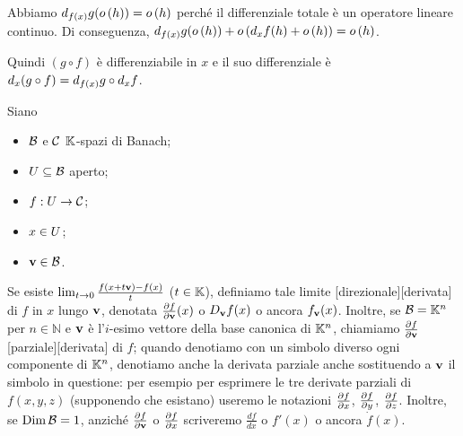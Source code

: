\par Abbiamo $\TotalDifferential{g}[f(x)](\Littleo{h}) = \Littleo{h}$ perch\'e il differenziale totale \`e un operatore lineare continuo. Di conseguenza, $\TotalDifferential{g}[f(x)](\Littleo{h}) + \Littleo{\TotalDifferential{f}[x](h) + \Littleo{h}} = \Littleo{h}$.
\par Quindi $(g \circ f)$ \`e differenziabile in $x$ e il suo differenziale \`e $\TotalDifferential{(g \circ f)}[x] = \TotalDifferential{g}[f(x)] \circ \TotalDifferential{f}[x]$. \EndProof
\begin{Definition}
	Siano
	\begin{itemize}
		\item $\mathcal{B}$ e $\mathcal{C}$ $\mathbb{K}$-spazi di Banach;
		\item $U \subseteq \mathcal{B}$ aperto;
		\item $f: U \rightarrow \mathcal{C}$;
		\item $x \in U$;
		\item $\mathbf{v} \in \mathcal{B}$.
	\end{itemize}
	Se esiste $\lim_{t \rightarrow 0} \frac{f(x + t\mathbf{v}) - f(x)}{t}$ ($t \in \mathbb{K}$), definiamo tale limite [direzionale][derivata] di $f$ in $x$ lungo $\mathbf{v}$, denotata $\frac{\partial f}{\partial \mathbf{v}}(x)$ o $D_{\mathbf{v}} f(x)$ o ancora $f_{\mathbf{v}}(x)$. Inoltre, se $\mathcal{B} = \mathbb{K}^n$ per $n \in \mathbb{N}$ e $\mathbf{v}$ \`e l'$i$-esimo vettore della base canonica di $\mathbb{K}^n$, chiamiamo $\frac{\partial f}{\partial \mathbf{v}}$ [parziale][derivata] di $f$; quando denotiamo con un simbolo diverso ogni componente di $\mathbb{K}^n$, denotiamo anche la derivata parziale anche sostituendo a $\mathbf{v}$ il simbolo in questione: per esempio per esprimere le tre derivate parziali di $f(x,y,z)$ (supponendo che esistano) useremo le notazioni $\frac{\partial f}{\partial x}$, $\frac{\partial f}{\partial y}$, $\frac{\partial f}{\partial z}$. Inoltre, se $\operatorname{\operatorname{Dim}}{\mathcal{B}} = 1$, anzich\'e $\frac{\partial f}{\partial \mathbf{v}}$ o $\frac{\partial f}{\partial x}$ scriveremo $\frac{df}{dx}$ o $f'(x)$ o ancora $\dot{f}(x)$.
\end{Definition}
